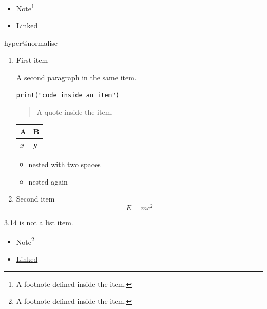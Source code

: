 \begin{itemize}
\item Note\footnote{\label{mark2tex:footnote:88cf43d55c883d1c1357c8dc91ca7f8d:1}A footnote defined inside the item.}
\item \href{\detokenize{https://example.org}}{Linked}
\end{itemize}
\ifcsname hyper@normalise\endcsname\else\PackageError{mark2tex}{Markdown links require hyperref}{Load \string\usepackage{hyperref} in the document preamble.}\fi
\begin{frame}[t,fragile]
\begin{enumerate}
\item First item

A second paragraph in the same item.

\begin{verbatim}
print("code inside an item")
\end{verbatim}

\begin{quote}
A quote inside the item.
\end{quote}

\par\addvspace{\medskipamount}
\noindent\begin{tabularx}{\linewidth}{@{}>{\raggedright\arraybackslash}X>{\raggedright\arraybackslash}X@{}}
\toprule
A & B \\
\midrule
$x$ & \textbf{y} \\
\bottomrule
\end{tabularx}
\par\addvspace{\medskipamount}
\begin{itemize}
\item nested with two spaces
\item nested again
\end{itemize}
\item Second item
\[
E = mc^2
\]
\end{enumerate}
3.14 is not a list item.

\begin{itemize}
\item Note\footnote{\label{mark2tex:footnote:88cf43d55c883d1c1357c8dc91ca7f8d:1}A footnote defined inside the item.}
\item \href{\detokenize{https://example.org}}{Linked}
\end{itemize}
\end{frame}

